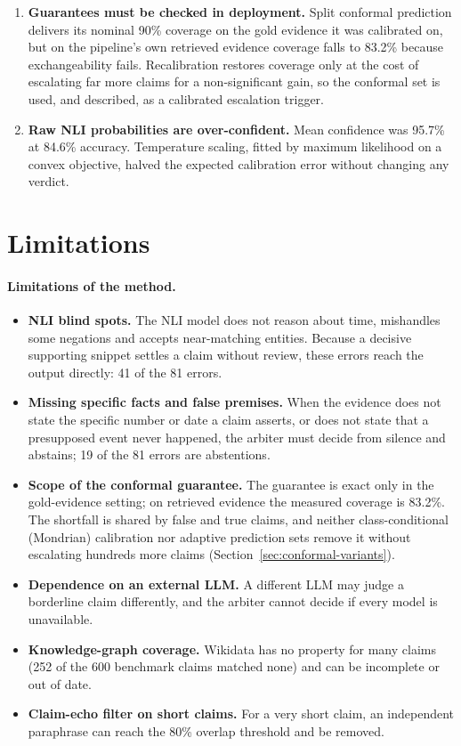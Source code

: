 \begin{enumerate}[itemsep=0.3em]
  \item \textbf{Guarantees must be checked in deployment.} Split conformal prediction delivers its nominal 90\% coverage on the gold evidence it was calibrated on, but on the pipeline's own retrieved evidence coverage falls to 83.2\% because exchangeability fails. Recalibration restores coverage only at the cost of escalating far more claims for a non-significant gain, so the conformal set is used, and described, as a calibrated escalation trigger.
  \item \textbf{Raw NLI probabilities are over-confident.} Mean confidence was 95.7\% at 84.6\% accuracy. Temperature scaling, fitted by maximum likelihood on a convex objective, halved the expected calibration error without changing any verdict.
\end{enumerate}

\section{Limitations}

\paragraph{Limitations of the method.}
\begin{itemize}[itemsep=0.2em]
  \item \textbf{NLI blind spots.} The NLI model does not reason about time, mishandles some negations and accepts near-matching entities. Because a decisive supporting snippet settles a claim without review, these errors reach the output directly: 41 of the 81 errors.
  \item \textbf{Missing specific facts and false premises.} When the evidence does not state the specific number or date a claim asserts, or does not state that a presupposed event never happened, the arbiter must decide from silence and abstains; 19 of the 81 errors are abstentions.
  \item \textbf{Scope of the conformal guarantee.} The guarantee is exact only in the gold-evidence setting; on retrieved evidence the measured coverage is 83.2\%. The shortfall is shared by false and true claims, and neither class-conditional (Mondrian) calibration nor adaptive prediction sets remove it without escalating hundreds more claims (Section~\ref{sec:conformal-variants}).
  \item \textbf{Dependence on an external LLM.} A different LLM may judge a borderline claim differently, and the arbiter cannot decide if every model is unavailable.
  \item \textbf{Knowledge-graph coverage.} Wikidata has no property for many claims (252 of the 600 benchmark claims matched none) and can be incomplete or out of date.
  \item \textbf{Claim-echo filter on short claims.} For a very short claim, an independent paraphrase can reach the 80\% overlap threshold and be removed.
\end{itemize}

